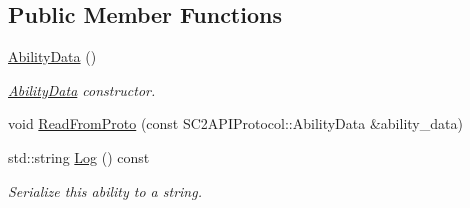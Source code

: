 \subsection*{Public Member Functions}
\begin{DoxyCompactItemize}
\item 
\mbox{\label{structsc2_1_1_ability_data_a77a93314c1b4a6b1cbdc6e1af7dbd2c0}} 
\hyperlink{structsc2_1_1_ability_data_a77a93314c1b4a6b1cbdc6e1af7dbd2c0}{Ability\+Data} ()
\begin{DoxyCompactList}\small\item\em \hyperlink{structsc2_1_1_ability_data}{Ability\+Data} constructor. \end{DoxyCompactList}\item 
void \hyperlink{structsc2_1_1_ability_data_a974e180b290ad684b2806232ccb55b5c}{Read\+From\+Proto} (const S\+C2\+A\+P\+I\+Protocol\+::\+Ability\+Data \&ability\+\_\+data)
\item 
\mbox{\label{structsc2_1_1_ability_data_a953b2d2ec2cf3aea11a468a433e53660}} 
std\+::string \hyperlink{structsc2_1_1_ability_data_a953b2d2ec2cf3aea11a468a433e53660}{Log} () const
\begin{DoxyCompactList}\small\item\em Serialize this ability to a string. \end{DoxyCompactList}\end{DoxyCompactItemize}
